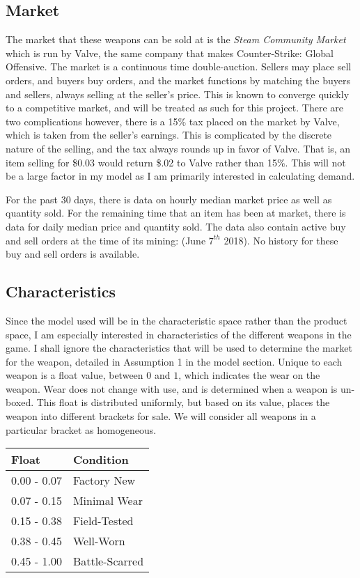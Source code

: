 \documentclass[12pt]{paper}
\begin{document}
\subsection{Market}


The market that these weapons can be sold at is the \emph{Steam
  Community Market} which is run by Valve, the same company that makes
Counter-Strike: Global Offensive. The market is a continuous time
double-auction. Sellers may place sell orders, and buyers buy orders,
and the market functions by matching the buyers and sellers, always
selling at the seller's price. This is known to converge quickly to a
competitive market, and will be treated as such for this
project. \cite{Efficiency} There are two complications however, there is a 15\% tax
placed on the market by Valve, which is taken from the seller's
earnings. This is complicated by the discrete nature of the selling,
and the tax always rounds up in favor of Valve. That is, an item
selling for \$0.03 would return \$.02 to Valve rather than 15\%. This
will not be a large factor in my model as I am primarily interested in
calculating demand.

For the past 30 days, there is data on hourly median market price as
well as quantity sold. For the remaining time that an item has been at
market, there is data for daily median price and quantity sold. The
data also contain active buy and sell orders at the time of its
mining: (June $7^{th}$ 2018). No history for these buy and sell orders
is available.

\subsection{Characteristics}

Since the model used will be in the characteristic space rather than
the product space, I am especially interested in characteristics of
the different weapons in the game. I shall ignore the characteristics
that will be used to determine the market for the weapon, detailed in
Assumption 1 in the model section. Unique to each weapon is a float
value, between $0$ and $1$, which indicates the wear on the
weapon. Wear does not change with use, and is determined when a weapon
is un-boxed. This float is distributed uniformly, but based on its
value, places the weapon into different brackets for sale. We will
consider all weapons in a particular bracket as homogeneous.
\begin{center}
\begin{tabular}{|l|l|}\hline
  Float & Condition\\\hline
  0.00 - 0.07 & Factory New\\
  0.07 - 0.15 & Minimal Wear\\
  0.15 - 0.38 & Field-Tested\\
  0.38 - 0.45 & Well-Worn\\
  0.45 - 1.00 & Battle-Scarred\\\hline
\end{tabular}
\end{center}
\end{document}
